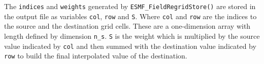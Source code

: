The {\tt indices} and {\tt weights} generated by {\tt ESMF\_FieldRegridStore()} are stored in the output
file as variables {\tt col}, {\tt row} and {\tt S}. Where {\tt col} and {\tt row} are the indices to the
source and the destination grid cells.  These are a one-dimension array with length defined by dimension 
{\tt n\_s}. {\tt S} is the weight which is multiplied by the source value indicated by {\tt col} and then
summed with the destination value indicated by {\tt row} to build the final interpolated value of the 
destination. 

